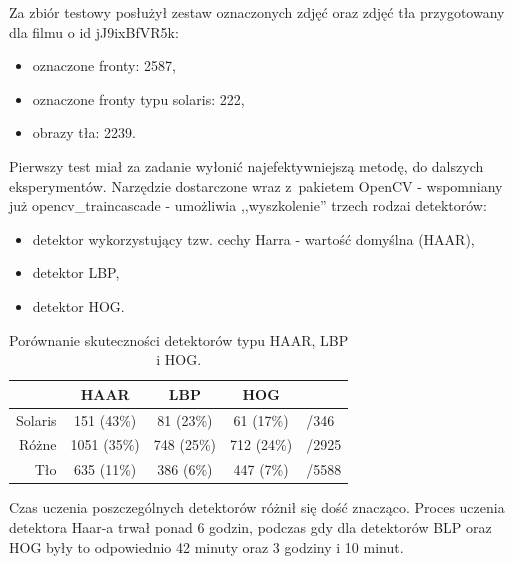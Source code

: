 Za zbiór testowy posłużył zestaw oznaczonych zdjęć oraz zdjęć tła
przygotowany dla filmu o id jJ9ixBfVR5k:
\begin{itemize}
\item oznaczone fronty: 2587,
\item oznaczone fronty typu solaris: 222,
\item obrazy tła: 2239.
\end{itemize}

Pierwszy test miał za zadanie wyłonić najefektywniejszą metodę, do dalszych
eksperymentów. Narzędzie dostarczone wraz z~pakietem OpenCV - wspomniany
już opencv\_traincascade - umożliwia ,,wyszkolenie'' trzech rodzai
detektorów:

\begin{itemize}
    \item detektor wykorzystujący tzw. cechy Harra - wartość 
        domyślna (HAAR),
    \item detektor LBP,
    \item detektor HOG.
\end{itemize}

\begin{table}[!h]
    \centering
    \begin{tabular}{r|c|c|c|l}
        & HAAR         & LBP        & HOG              &       \\
        \hline
Solaris & 151  (43\%)  & 81  (23\%) & 61 (17\%)        & /346  \\
Różne   & 1051 (35\%)  & 748 (25\%) & 712 (24\%)       & /2925 \\
Tło     & 635  (11\%)  & 386 (6\%)  & 447 (7\%)        & /5588 \\
    \end{tabular}
    \caption{Porównanie skuteczności detektorów typu HAAR, LBP i HOG.}
    \label{tab:haar_lbp_hog_comparison}
\end{table}

Czas uczenia poszczególnych detektorów różnił się dość znacząco. Proces
uczenia detektora Haar-a trwał ponad 6 godzin, podczas gdy dla detektorów
BLP oraz HOG były to odpowiednio 42 minuty oraz 3 godziny i 10 minut.

